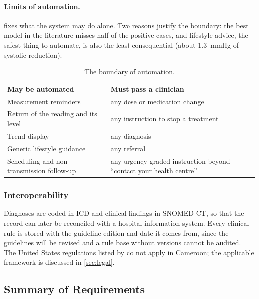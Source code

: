 \paragraph{Limits of automation.}  fixes what the system may do alone. Two reasons justify the boundary: the best model in the literature misses half of the positive cases, and lifestyle advice, the safest thing to automate, is also the least consequential (about 1.3~mmHg of systolic reduction).

\begin{table}[htbp]
\centering\small
\caption{The boundary of automation.}\label{tab:automation-boundary}
\begin{tabularx}{\textwidth}{@{}X X@{}}
\toprule
\textbf{May be automated} & \textbf{Must pass a clinician} \\
\midrule
Measurement reminders & any dose or medication change \\
Return of the reading and its level & any instruction to stop a treatment \\
Trend display & any diagnosis \\
Generic lifestyle guidance & any referral \\
Scheduling and non-transmission follow-up & any urgency-graded instruction beyond ``contact your health centre'' \\
\bottomrule
\end{tabularx}
\end{table}

\subsubsection{Interoperability}\label{sec:interop}

Diagnoses are coded in ICD and clinical findings in SNOMED CT, so that the record can later be reconciled with a hospital information system. Every clinical rule is stored with the guideline edition and date it comes from, since the guidelines will be revised and a rule base without versions cannot be audited. The United States regulations listed by \textcite{liu2025review} do not apply in Cameroon; the applicable framework is discussed in \cref{sec:legal}.


\subsection{Summary of Requirements}\label{sec:requirements-summary}\label{sec:spec13}\label{sec:spec21}\label{sec:spec22}\label{sec:spec23}\label{sec:spec24}

